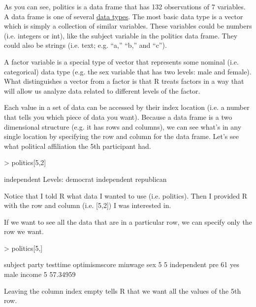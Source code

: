 \documentclass[12pt]{article}
\begin{document}
As you can see, politics is a data frame that has 132 observations of 7 variables.
A data frame is one of several
\href{http://www.statmethods.net/input/datatypes.html}{data types}. The most basic
data type is a vector which is simply a collection of similar variables. These
variables could be numbers (i.e. integers or int), like the subject variable in
the politics data frame. They could also be strings (i.e. text; e.g. ``a,'' ``b,''
and ``c'').

A factor variable is a special type of vector that represents some nominal
(i.e. categorical) data type (e.g. the sex variable that has two levels: male
and female). What distinguishes a vector from a factor is that R treats factors
in a way that will allow us analyze data related to different levels of the
factor.

Each value in a set of data can be accessed by their index
location (i.e. a number that tells you which piece of data you want). Because
a data frame is a two dimensional structure (e.g. it has rows and columns), we
can see what's in any single location by specifying the row and column for the
data frame. Let's see what political affiliation the 5th participant had.

\begin{Schunk}
\begin{Sinput}
> politics[5,2]
\end{Sinput}
\begin{Soutput}
[1] independent
Levels: democrat independent republican
\end{Soutput}
\end{Schunk}

Notice that I told R what data I wanted to use (i.e. politics). Then I provided
R with the row and column (i.e. [5,2]) I was interested in.

If we want to see all the data that are in a particular row, we can specify only
the row we want.

\begin{Schunk}
\begin{Sinput}
> politics[5,]
\end{Sinput}
\begin{Soutput}
  subject       party testtime optimismscore minwage  sex
5       5 independent      pre            61     yes male
    income
5 57.34959
\end{Soutput}
\end{Schunk}

Leaving the column index empty tells R that we want all the values of the 5th row.
\end{document}
